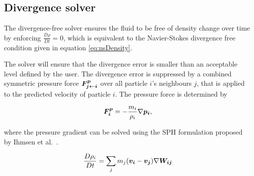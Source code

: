 \subsection{Divergence solver} \label{divergenceSolver}

The divergence-free solver ensures the fluid to be free of density change over time by enforcing $\frac{D\rho}{Dt} = 0$, which is equivalent to the Navier-Stokes divergence free condition given in equation \ref{eq:nsDensity}.

The solver will ensure that the divergence error is smaller than an acceptable level defined by the user. The divergence error is suppressed by a combined symmetric pressure force $\bm{F_{j\leftarrow i}^p} $ over all particle $i$'s neighbours $j$, that is applied to the predicted velocity of particle $i$. The pressure force is determined by 

\begin{equation} \label{eq:pressure}
\bm{F_i^p} = -\frac{m_i}{\rho_i}\nabla \bm{p_i},
\end{equation}

where the pressure gradient can be solved using the SPH formulation proposed by Ihmsen et al.~\cite{ihmsen}.

\begin{equation} \label{eq:dpdt}
\frac{D\rho_i}{Dt} = \sum_j m_j (\bm{v_i} - \bm{v_j})\nabla \bm{W_{ij}}
\end{equation}

